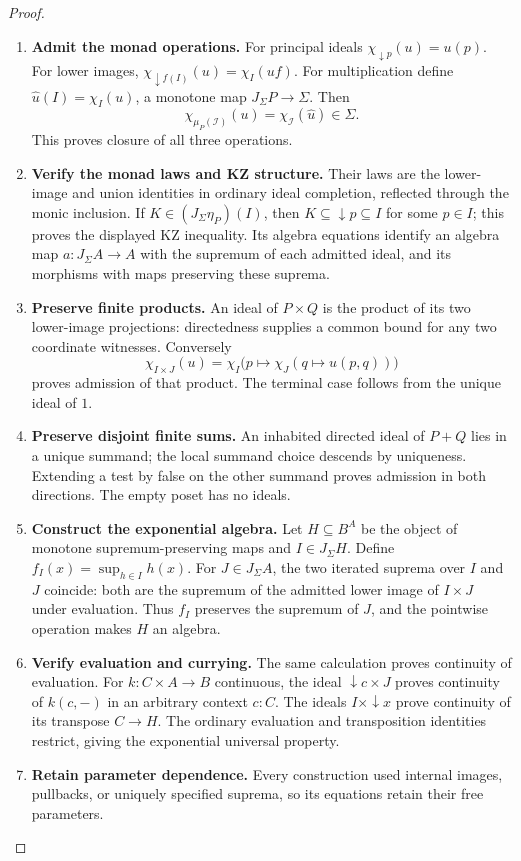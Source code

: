 \documentclass[11pt,a4paper]{article}
\numberwithin{algorithm}{section}
\numberwithin{equation}{section}
\theoremstyle{definition}
\theoremstyle{remark}
\theoremstyle{plain}
\newcommand{\J}{J_{\Sigma}}
\theoremstyle{definition}
\theoremstyle{plain}
\begin{document}
\begin{proof}\leavevmode
\begin{enumerate}[leftmargin=*,align=left]
\item \textbf{Admit the monad operations.}
For principal ideals $\chi_{\downarrow p}(u)=u(p)$. For lower images,
$\chi_{\downarrow f(I)}(u)=\chi_I(u f)$. For multiplication define
$\widehat u(I)=\chi_I(u)$, a monotone map $\J P\to\Sigma$.
Then
\[
 \chi_{\mu_P(\mathcal I)}(u)=\chi_{\mathcal I}(\widehat u)\in\Sigma.
\]
This proves closure of all three operations.

\item \textbf{Verify the monad laws and KZ structure.}
Their laws are the
lower-image and union identities in ordinary ideal completion, reflected
through the monic inclusion. If $K\in(\J\eta_P)(I)$, then
$K\subseteq\downarrow p\subseteq I$ for some $p\in I$; this proves
the displayed KZ inequality. Its algebra equations identify an algebra
map $a:\J A\to A$ with the supremum of each admitted ideal, and its
morphisms with maps preserving these suprema.

\item \textbf{Preserve finite products.}
An ideal of $P\times Q$ is the product of its two lower-image
projections: directedness supplies a common bound for any two
coordinate witnesses. Conversely
\[
 \chi_{I\times J}(u)
 =\chi_I\bigl(p\mapsto\chi_J(q\mapsto u(p,q))\bigr)
\]
proves admission of that product. The terminal case follows from
the unique ideal of $1$.

\item \textbf{Preserve disjoint finite sums.}
An inhabited directed ideal of $P+Q$
lies in a unique summand; the local summand choice descends by
uniqueness. Extending a test by false on the other summand proves
admission in both directions. The empty poset has no ideals.

\item \textbf{Construct the exponential algebra.}
Let $H\subseteq B^A$ be the object of monotone supremum-preserving
maps and $I\in\J H$. Define
$f_I(x)=\sup_{h\in I}h(x)$. For $J\in\J A$, the two iterated suprema
over $I$ and $J$ coincide: both are the supremum of the admitted
lower image of $I\times J$ under evaluation. Thus $f_I$ preserves
the supremum of $J$, and the pointwise operation makes $H$ an algebra.

\item \textbf{Verify evaluation and currying.}
The same calculation proves continuity of evaluation.
For $k:C\times A\to B$ continuous, the ideal
$\downarrow c\times J$ proves continuity of $k(c,-)$ in an arbitrary
context $c:C$. The ideals $I\times\downarrow x$ prove continuity
of its transpose $C\to H$. The ordinary evaluation and transposition
identities restrict, giving the exponential universal property.

\item \textbf{Retain parameter dependence.}
Every construction used internal images, pullbacks, or uniquely
specified suprema, so its equations retain their free parameters.
\end{enumerate}
\end{proof}
\end{document}
